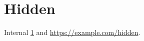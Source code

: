 \documentclass{article}
\begin{document}
\section{Hidden}\label{sec:h}
Internal \ref{sec:h} and \url{https://example.com/hidden}.
\end{document}
